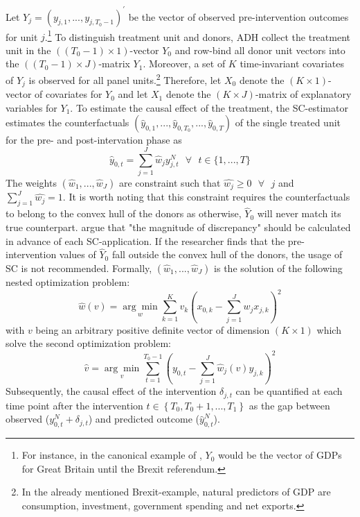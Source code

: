 Let $Y_j = (y_{j,1}, ..., y_{j,T_{0}-1})^\prime$ be the vector of observed pre-intervention outcomes for unit $j$.\footnote{For instance, in the canonical example of \cite{abadie:2003}, $Y_0$ would be the vector of \ac{GDP}s for Great Britain until the Brexit referendum.} To distinguish treatment unit and donors, \ac{ADH} collect the treatment unit in the $((T_{0}-1) \times 1) $-vector $Y_0$ and row-bind all donor unit vectors into the $((T_{0}-1) \times J)$-matrix $Y_1$. Moreover, a set of $K$ time-invariant covariates of $Y_j$ is observed for all panel units.\footnote{In the already mentioned Brexit-example, natural predictors of \ac{GDP} are consumption, investment, government spending and net exports.} Therefore, let $X_0$ denote the $(K \times 1)$-vector of covariates for $Y_0$ and let $X_1$ denote the $(K \times J)$-matrix of explanatory variables for $Y_1$. To estimate the causal effect of the treatment, the \ac{SC}-estimator estimates the counterfactuals $(\widehat{y}_{0,1}, ...,\widehat{y}_{0,T_0},..., \widehat{y}_{0,T})$ of the single treated unit for the pre- and post-intervation phase as 
\[
\widehat{y}_{0,t} = \sum_{j = 1}^{J} \widehat{w}_j y^{N}_{j,t} \text{ } \forall \text{ } t \in \{1,...,T\}
\]
The weights $(\widehat{w}_1, ... , \widehat{w}_J)$ are constraint such that $\widehat{w_j} \geq 0 \text{ } \forall \text{ } j$ and $\sum_{j = 1}^{J} \widehat{w_j} = 1$. It is worth noting that this constraint requires the counterfactuals to belong to the convex hull of the donors as otherwise, $\widehat{Y}_{0}$ will never match its true counterpart. \cite{abadie:2010} argue that "the magnitude of discrepancy" should be calculated in advance of each \ac{SC}-application. If the researcher finds that the pre-intervention values of $\widehat{Y}_{0}$ fall outside the convex hull of the donors, the usage of \ac{SC} is not recommended. Formally, $(\widehat{w}_1, ... , \widehat{w}_J)$ is the solution of the following nested optimization problem:
\[
\widehat{w}(v) = 
\underset{w}{\arg\min}
\sum_{k = 1}^{K} v_k \left(x_{0,k} - \sum_{j = 1}^{J} w_j x_{j,k} \right)^2 
\]
with $v$ being an arbitrary positive definite vector of dimension $(K \times 1)$ which solve the second optimization problem:
\[
\widehat{v} = 
\underset{v}{\arg\min}
\sum_{t = 1}^{T_0 - 1} \left(y_{0,t} - \sum_{j = 1}^{J}  \widehat{w}_j(v) y_{j,k} \right)^2
\]
Subsequently, the causal effect of the intervention $\delta_{j,t}$ can be quantified at each time point after the intervention $t \in \left\lbrace T_{0},T_{0}+1, ..., T_{1}\right\rbrace $ as the gap between observed ($y^{N}_{0,t} + \delta_{j,t}$) and predicted outcome ($\widehat{y}^{N}_{0,t}$).

